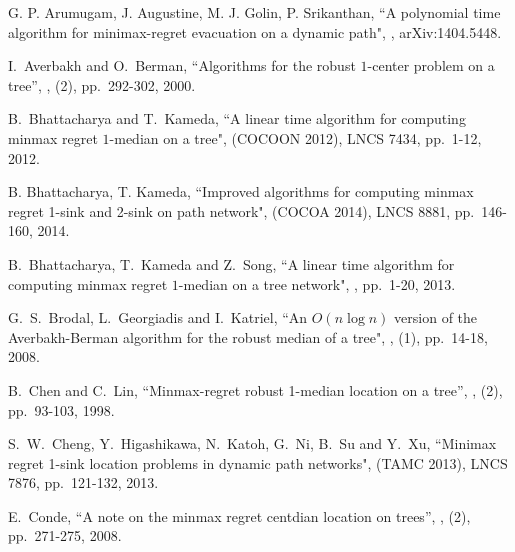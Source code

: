 \documentclass[a4paper]{llncs}
\begin{document}
\begin{thebibliography}{99}

		G. P. Arumugam, J. Augustine, M. J. Golin, P. Srikanthan,
		\newblock ``A polynomial time algorithm for minimax-regret evacuation on a dynamic path",
		,
		\newblock arXiv:1404.5448.

		I.~Averbakh and O.~Berman, 
		\newblock ``Algorithms for the robust $1$-center problem on a tree'', 
		,
		(2), pp.~292-302, 2000.
	
		B.~Bhattacharya and T.~Kameda,
		\newblock ``A linear time algorithm for computing minmax regret $1$-median on a tree",
		 (COCOON 2012),
		\newblock LNCS 7434, pp.~1-12, 2012. 
		
		B. Bhattacharya, T. Kameda,
		\newblock ``Improved algorithms for computing minmax regret 1-sink and 2-sink on path network",
		 (COCOA 2014),
		\newblock LNCS 8881, pp.~146-160, 2014.
	
		B.~Bhattacharya, T.~Kameda and Z.~Song,
		\newblock ``A linear time algorithm for computing minmax regret $1$-median on a tree network",
		,
		\newblock pp.~1-20, 2013. 

		G.~S.~Brodal, L.~Georgiadis and I.~Katriel,
		\newblock ``An $O(n \log n)$ version of the Averbakh-Berman algorithm for the robust median of a tree",
		,
		(1), pp.~14-18, 2008. 

		B.~Chen and C.~Lin, 
		\newblock ``Minmax-regret robust 1-median location on a tree'', 
		,
		(2), pp.~93-103, 1998.



		S.~W.~Cheng, Y.~Higashikawa, N.~Katoh, G.~Ni, B.~Su and Y.~Xu,
		\newblock ``Minimax regret 1-sink location problems in dynamic path networks",
		 (TAMC 2013),
		\newblock LNCS 7876, pp.~121-132, 2013.



		E.~Conde, 
		\newblock ``A note on the minmax regret centdian location on trees'',
		,
		(2), pp.~271-275, 2008.


\end{thebibliography}
\end{document}
